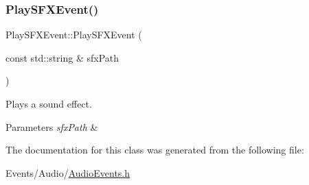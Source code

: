 \subsubsection{\texorpdfstring{Play\+S\+F\+X\+Event()}{PlaySFXEvent()}}
{\footnotesize\ttfamily Play\+S\+F\+X\+Event\+::\+Play\+S\+F\+X\+Event (\begin{DoxyParamCaption}\item[{const std\+::string \&}]{sfx\+Path }\end{DoxyParamCaption})\hspace{0.3cm}{\ttfamily [inline]}}



Plays a sound effect. 


\begin{DoxyParams}{Parameters}
{\em sfx\+Path} & \\
\hline
\end{DoxyParams}


The documentation for this class was generated from the following file\+:\begin{DoxyCompactItemize}
\item 
Events/\+Audio/\hyperlink{AudioEvents_8h}{Audio\+Events.\+h}\end{DoxyCompactItemize}
